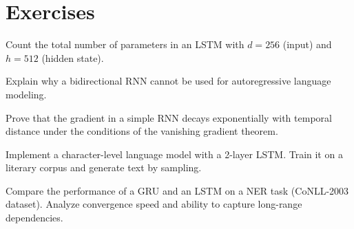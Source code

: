 \section{Exercises}
\label{sec:seq:exercises}

\begin{exercise}[$\star$]
Count the total number of parameters in an LSTM with $d = 256$ (input) and
$h = 512$ (hidden state).
\end{exercise}

\begin{exercise}[$\star$]
Explain why a bidirectional RNN cannot be used for autoregressive language
modeling.
\end{exercise}

\begin{exercise}[$\star\star$]
Prove that the gradient in a simple RNN decays exponentially with temporal
distance under the conditions of the vanishing gradient theorem.
\end{exercise}

\begin{exercise}[$\star\star$]
Implement a character-level language model with a 2-layer LSTM. Train it on a
literary corpus and generate text by sampling.
\end{exercise}

\begin{exercise}[$\star\star\star$]
Compare the performance of a GRU and an LSTM on a NER task (CoNLL-2003
dataset). Analyze convergence speed and ability to capture long-range
dependencies.
\end{exercise}
